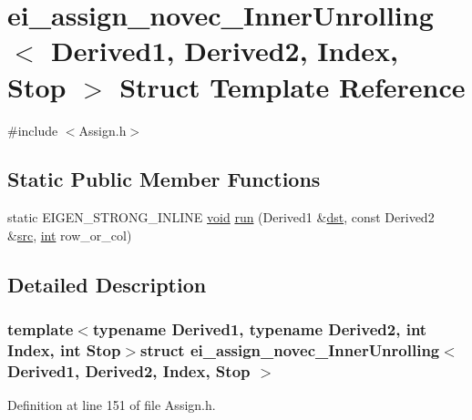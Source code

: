 \hypertarget{structei__assign__novec___inner_unrolling}{\section{ei\-\_\-assign\-\_\-novec\-\_\-\-Inner\-Unrolling$<$ Derived1, Derived2, Index, Stop $>$ Struct Template Reference}
\label{structei__assign__novec___inner_unrolling}
}


{\ttfamily \#include $<$Assign.\-h$>$}

\subsection*{Static Public Member Functions}
\begin{DoxyCompactItemize}
\item 
static E\-I\-G\-E\-N\-\_\-\-S\-T\-R\-O\-N\-G\-\_\-\-I\-N\-L\-I\-N\-E \hyperlink{group___u_a_v_objects_plugin_ga444cf2ff3f0ecbe028adce838d373f5c}{void} \hyperlink{structei__assign__novec___inner_unrolling_ab0ceb8c239774fd613cd0c19a9d3f86a}{run} (Derived1 \&\hyperlink{glext_8h_a92034251bfd455d524a9b5610cddba00}{dst}, const Derived2 \&\hyperlink{glext_8h_a72e0fdf0f845ded60b1fada9e9195cd7}{src}, \hyperlink{ioapi_8h_a787fa3cf048117ba7123753c1e74fcd6}{int} row\-\_\-or\-\_\-col)
\end{DoxyCompactItemize}


\subsection{Detailed Description}
\subsubsection*{template$<$typename Derived1, typename Derived2, int Index, int Stop$>$struct ei\-\_\-assign\-\_\-novec\-\_\-\-Inner\-Unrolling$<$ Derived1, Derived2, Index, Stop $>$}



Definition at line 151 of file Assign.\-h.



